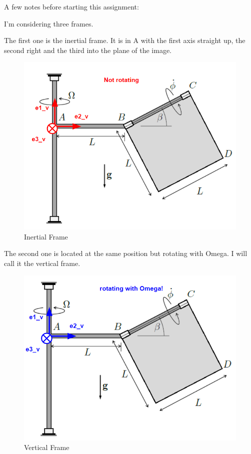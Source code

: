 A few notes before starting this assignment:

I'm considering three frames. 

The first one is the inertial frame. It is in A with the first axis straight up, the second right and the third into the plane of the image.

\begin{figure}[ht]
    \centering
    \includegraphics[scale=0.5]{images/inertial_frame.png}
    \caption{Inertial Frame}
    \label{fig:inertial_frame}
\end{figure}

\noindent The second one is located at the same position but rotating with Omega. I will call it the vertical frame.

\begin{figure}[ht]
    \centering
    \includegraphics[scale=0.5]{images/vertical_frame.png}
    \caption{Vertical Frame}
    \label{fig:vertical_frame}
\end{figure}
\clearpage %

